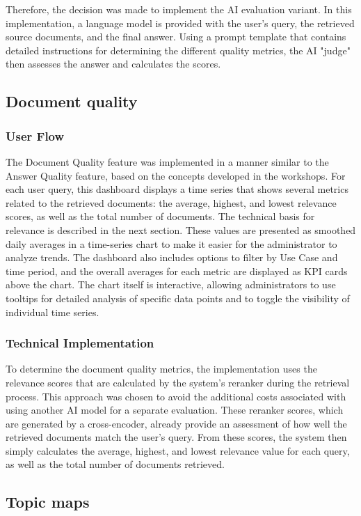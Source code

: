 \documentclass[
	english,
	ruledheaders=section,%
	class=report,%
	thesis={type=bachelor},%
	accentcolor=1b,%
	custommargins=true,%
	marginpar=false,%
	parskip=half-,%
	fontsize=11pt,%
	DIV=14,
]{tudapub}
\begin{document}
Therefore, the decision was made to implement the AI evaluation variant. In this implementation, a language model is provided with the user's query, the retrieved source documents, and the final answer. Using a prompt template that contains detailed instructions for determining the different quality metrics, the AI "judge" then assesses the answer and calculates the scores.
\subsection{Document quality}
\subsubsection{User Flow}
The Document Quality feature was implemented in a manner similar to the Answer Quality feature, based on the concepts developed in the workshops. For each user query, this dashboard displays a time series that shows several metrics related to the retrieved documents: the average, highest, and lowest relevance scores, as well as the total number of documents. The technical basis for relevance is described in the next section. These values are presented as smoothed daily averages in a time-series chart to make it easier for the administrator to analyze trends. The dashboard also includes options to filter by Use Case and time period, and the overall averages for each metric are displayed as KPI cards above the chart. The chart itself is interactive, allowing administrators to use tooltips for detailed analysis of specific data points and to toggle the visibility of individual time series.

\subsubsection{Technical Implementation}
To determine the document quality metrics, the implementation uses the relevance scores that are calculated by the system's reranker during the retrieval process. This approach was chosen to avoid the additional costs associated with using another AI model for a separate evaluation. These reranker scores, which are generated by a cross-encoder, already provide an assessment of how well the retrieved documents match the user's query. From these scores, the system then simply calculates the average, highest, and lowest relevance value for each query, as well as the total number of documents retrieved.
\subsection{Topic maps}
\end{document}
